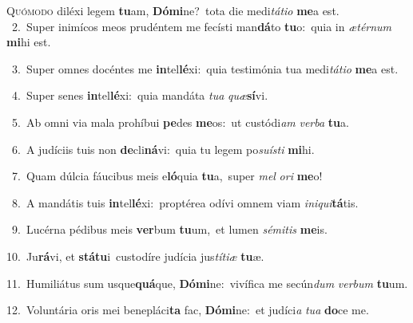 \lettrine{\initial\textcolor{\initialcolor}{Q}}{uómodo} diléxi legem \textbf{tu}\-am, \textbf{Dó}\-\textbf{mi}ne?~\star tota die medi\-\textit{tá}\-\textit{ti}\textit{o} \textbf{me}\-a est.\\
{\numbfont\textcolor{\numbcolor}{~2.}}~Super inimícos meos prudéntem me fecísti man\-\textbf{dá}\-to \textbf{tu}\-o:~\star quia in \textit{æ}\-\textit{tér}\textit{num} \textbf{mi}\-hi est.\par
{\numbfont\textcolor{\numbcolor}{~3.}}~Super omnes docéntes me \textbf{in}\-tel\-\textbf{lé}\-xi:~\star quia testimónia tua medi\-\textit{tá}\-\textit{ti}\textit{o} \textbf{me}\-a est.\par
{\numbfont\textcolor{\numbcolor}{~4.}}~Super senes \textbf{in}\-tel\-\textbf{lé}\-xi:~\star quia mandáta \textit{tu}\-\textit{a} \textit{quæ}\-\textbf{sí}vi.\par
{\numbfont\textcolor{\numbcolor}{~5.}}~Ab omni via mala prohíbui \textbf{pe}\-des \textbf{me}\-os:~\star ut custódi\textit{am} \textit{ver}\-\textit{ba} \textbf{tu}\-a.\par
{\numbfont\textcolor{\numbcolor}{~6.}}~A judíciis tuis non \textbf{de}\-cli\-\textbf{ná}\-vi:~\star quia tu legem po\-\textit{su}\-\textit{ís}\textit{ti} \textbf{mi}\-hi.\par
{\numbfont\textcolor{\numbcolor}{~7.}}~Quam dúlcia fáucibus meis e\-\textbf{ló}\-quia \textbf{tu}\-a,~\star super \textit{mel} \textit{o}\-\textit{ri} \textbf{me}\-o!\par
{\numbfont\textcolor{\numbcolor}{~8.}}~A mandátis tuis \textbf{in}\-tel\-\textbf{lé}\-xi:~\star proptérea odívi omnem viam \textit{in}\-\textit{i}\textit{qui}\textbf{tá}tis.\par
{\numbfont\textcolor{\numbcolor}{~9.}}~Lucérna pédibus meis \textbf{ver}\-bum \textbf{tu}\-um,~\star et lumen \textit{sé}\-\textit{mi}\textit{tis} \textbf{me}\-is.\par
{\numbfont\textcolor{\numbcolor}{10.}}~Ju\-\textbf{rá}\-vi, et \textbf{stá}\-\textbf{tu}i~\star custodíre judícia jus\-\textit{tí}\-\textit{ti}\textit{æ} \textbf{tu}\-æ.\par
{\numbfont\textcolor{\numbcolor}{11.}}~Humiliátus sum usque\-\textbf{quá}\-que, \textbf{Dó}\-\textbf{mi}ne:~\star vivífica me secún\textit{dum} \textit{ver}\-\textit{bum} \textbf{tu}\-um.\par
{\numbfont\textcolor{\numbcolor}{12.}}~Voluntária oris mei benepláci\textbf{ta} fac, \textbf{Dó}\-\textbf{mi}ne:~\star et judíci\textit{a} \textit{tu}\-\textit{a} \textbf{do}\-ce me.\par
